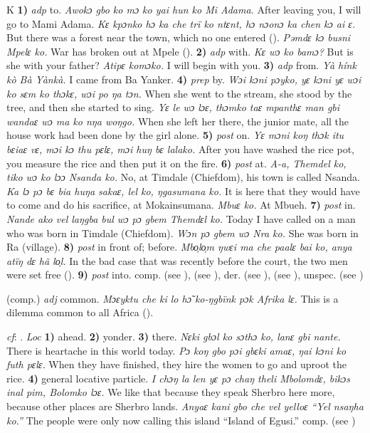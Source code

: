 \begin{letter}{K}
 \textbf{1)} \textit{adp} to. \textit{Awokɔ gbo ko mɔ ko yai hun ko Mi Adama.} After leaving you, I will go to Mami Adama. \textit{Kɛ kpɔnko hɔ ka che trï ko ntɛnt, hɔ nɔonɔ ka chen kɔ ai ɛ.} But there was a forest near the town, which no one entered (\citealt{Pichl1967}). \textit{Pəmdɛ kɔ busni Mpelɛ ko.} War has broken out at Mpele (\citealt{Pichl1967}). \textbf{2)} \textit{adp} with. \textit{Kɛ wɔ ko bamɔ?} But is she with your father? \textit{Atipɛ komɔko.} I will begin with you. \textbf{3)} \textit{adp} from. \textit{Yà hínk kò Bà Yànkà.} I came from Ba Yanker. \textbf{4)} \textit{prep} by. \textit{Wɔi kɔni pɔyko, yɛ kɔni yɛ wɔi ko sɛm ko thɔkɛ, wɔi po ŋa tɔn.} When she went to the stream, she stood by the tree, and then she started to sing. \textit{Yɛ le wɔ lɔɛ, thɔmko taɛ mpanthɛ man gbi wandaɛ wɔ ma ko nŋa woŋgo.} When she left her there, the junior mate, all the house work had been done by the girl alone. \textbf{5)} \textit{post} on. \textit{Yɛ mɔni koŋ thɔk itu bɛiaɛ vɛ, mɔi kɔ thu pɛlɛ, mɔi huŋ bɛ lalako.} After you have washed the rice pot, you measure the rice and then put it on the fire. \textbf{6)} \textit{post} at. \textit{A-a, Themdel ko, tiko wɔ ko lɔɔ Nsanda ko.} No, at Timdale (Chiefdom), his town is called Nsanda. \textit{Ka lɔ pɔ bɛ bia huŋa sakaɛ, lel ko, ŋgasumana ko.} It is here that they would have to come and do his sacrifice, at Mokainsumana. \textit{Mbuɛ ko.} At Mbueh. \textbf{7)} \textit{post} in. \textit{Nande ako vel laŋgba bul wɔ pɔ gbem Themdɛl ko.} Today I have called on a man who was born in Timdale (Chiefdom). \textit{Wɔn pɔ gbem wɔ Nra ko.} She was born in Ra (village). \textbf{8)} \textit{post} in front of; before. \textit{Mbo̹lo̹m ŋwɛi ma che paalɛ bai ko, anya atïŋ dɛ hã lo̹l.} In the bad case that was recently before the court, the two men were set free (\citealt{Pichl1967}). \textbf{9)} \textit{post} into. comp.  (see ),  (see ), der.  (see ),  (see ), unspec.  (see ) 

 (comp.) \textit{adj} common. \textit{Mɔɛyktu che ki lo hɔ̃ ko-ŋgbïnk pɔk Afrika lɛ.} This is a dilemma common to all Africa (\citealt{Pichl1967}). 

 \textit{cf}: . \textit{Loc} \textbf{1)} ahead. \textbf{2)} yonder. \textbf{3)} there. \textit{Nɛki gbɔl ko sɔthɔ ko, lanɛ gbi nante.} There is heartache in this world today. \textit{Pɔ koŋ gbo pɔi gbɛki amaɛ, ŋai kɔni ko futh pɛlɛ.} When they have finished, they hire the women to go and uproot the rice. \textbf{4)} general locative particle. \textit{I chɔŋ la len yɛ pɔ chaŋ theli Mbolomdɛ, bikɔs inal pim, Bolomko lɔɛ.} We like that because they speak Sherbro here more, because other places are Sherbro lands. \textit{Anyaɛ kani gbo che vel yelloɛ “Yel nsaŋha ko.”} The people were only now calling this island “Island of Egusi.” comp.  (see ) 


\end{letter}
